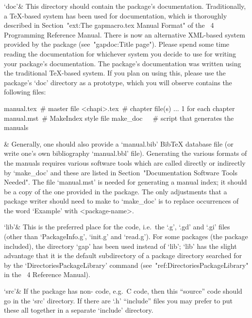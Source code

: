 `doc'&
This directory should contain the package's documentation. Traditionally,
a {\TeX}-based system has been used for {\GAP}  documentation,  which  is
thoroughly described in Section~"ext:The gapmacro.tex Manual  Format"  of
the {\GAP}~4 Programming Reference Manual. There is  now  an  alternative
XML-based  system  provided  by  the  {\GAP}   package   
(see~"gapdoc:Title  page").  Please   spend   some   time   reading   the
documentation for whichever system you decide to  use  for  writing  your
package's  documentation.  The  {\Example}  package's  documentation  was
written using the traditional {\TeX}-based system. If you plan  on  using
this, please use the {\Example} package's `doc' directory as a prototype,
which you will observe contains the following files:

manual.tex\ \# master file
<chapi>.tex\ \# chapter file(s) ... 1 for each chapter
manual.mst\ \# MakeIndex style file
make_doc\ \ \ \# script that generates the manuals

&
Generally, one should also provide a `manual.bib' Bib{\TeX} database file
(or write one's  own  bibliography  `manual.bbl'  file).  Generating  the
various formats of the manuals requires various software tools which  are
called directly or indirectly by  `make_doc'  and  these  are  listed  in
Section~"Documentation Software Tools Needed". The file  `manual.mst'  is
needed for generating a manual index; it should be  a  copy  of  the  one
provided in the {\Example} package. The only adjustments that  a  package
writer should need to make to `make_doc' is to replace occurrences of the
word `Example' with <package-name>.

`lib'&
This is the preferred place for the {\GAP} code, i.e.~the `.g', `.gd' and
`.gi' files (other than `PackageInfo.g', `init.g' and `read.g'). For some
packages (the {\Example} package included), the directory `gap' has  been
used instead of `lib'; `lib' has the slight  advantage  that  it  is  the
default  subdirectory  of  a  package  directory  searched  for  by   the
`DirectoriesPackageLibrary' command  (see~"ref:DirectoriesPackageLibrary"
in the {\GAP}~4 Reference Manual).

`src'&
If the package has non-{\GAP} code, e.g.~C  code,  then  this  ``source''
code should go in the `src' directory.  If  there  are  `.h'  ``include''
files you may prefer to put these all together in  a  separate  `include'
directory.

\enditems

